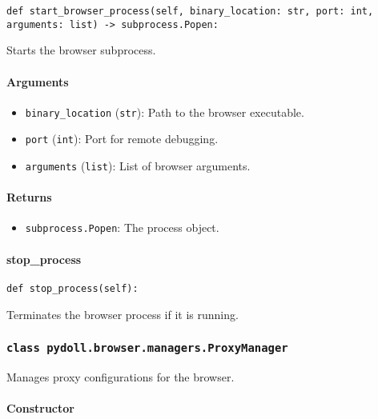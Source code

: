 \documentclass{article}
\begin{document}
\begin{lstlisting}[style=pythonstyle]
def start_browser_process(self, binary_location: str, port: int, arguments: list) -> subprocess.Popen:
\end{lstlisting}

\noindent Starts the browser subprocess.

\paragraph{Arguments}

\begin{itemize}
    \item \lstinline[style=pythonstyle]|binary_location| (\lstinline[style=pythonstyle]|str|): Path to the browser executable.
    \item \lstinline[style=pythonstyle]|port| (\lstinline[style=pythonstyle]|int|): Port for remote debugging.
    \item \lstinline[style=pythonstyle]|arguments| (\lstinline[style=pythonstyle]|list|): List of browser arguments.
\end{itemize}

\paragraph{Returns}

\begin{itemize}
    \item \lstinline[style=pythonstyle]|subprocess.Popen|: The process object.
\end{itemize}

\paragraph{stop\_process}

\begin{lstlisting}[style=pythonstyle]
def stop_process(self):
\end{lstlisting}

\noindent Terminates the browser process if it is running.

\subsubsection*{\texttt{class pydoll.browser.managers.ProxyManager}}
\noindent Manages proxy configurations for the browser.

\paragraph{Constructor}
\end{document}
